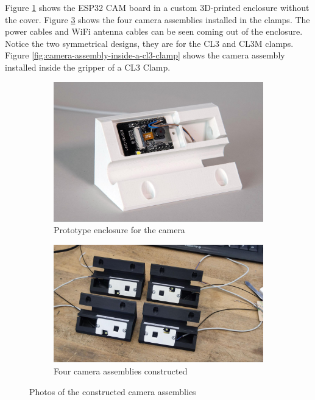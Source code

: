 Figure \ref{fig:esp32-cam-board-in-case} shows the ESP32 CAM board in a custom 3D-printed enclosure without the cover. Figure \ref{fig:four-camera-assemblies-constructed} shows the four camera assemblies installed in the clamps. The power cables and WiFi antenna cables can be seen coming out of the enclosure. Notice the two symmetrical designs, they are for the CL3 and CL3M clamps. Figure \ref{fig:camera-assembly-inside-a-cl3-clamp} shows the camera assembly installed inside the gripper of a CL3 Clamp. 

\begin{figure}[!h]
    \centering
    \begin{subfigure}[b]{0.49\textwidth}
        \centering
        \includegraphics[width=\textwidth]{images/08/img14.jpg}
        \caption{Prototype enclosure for the camera}
        \label{fig:esp32-cam-board-in-case}
    \end{subfigure}
    \hfill
    \begin{subfigure}[b]{0.49\textwidth}
        \centering
        \includegraphics[width=\textwidth]{images/08/img15.jpg}
        \caption{Four camera assemblies constructed}
        \label{fig:four-camera-assemblies-constructed}
    \end{subfigure}
    \caption{Photos of the constructed camera assemblies}
\end{figure}

